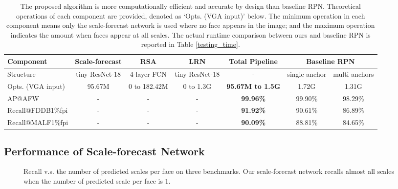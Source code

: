 \documentclass[10pt,twocolumn,letterpaper]{article}
\begin{document}
\begin{table*}
	\caption{The proposed algorithm is more computationally efficient and accurate by design than baseline RPN.
		Theoretical operations of each component are provided, denoted as `Opts. (VGA input)' below.
The minimum operation in each component means only the scale-forecast network is used where no face appears in the image; and the maximum operation indicates the amount when faces appear at all scales.
The actual runtime comparison between ours and baseline RPN is reported in Table \ref{testing_time}.
}
	\vspace{-.2cm}
	\footnotesize{
		\begin{center}
			\begin{tabular}{ l|c  c c c | c c}
				\toprule
				Component  & Scale-forecast & RSA & LRN  & Total Pipeline & \multicolumn{2}{c}{Baseline RPN}\\
				\midrule
				Structure & tiny ResNet-18 & 4-layer FCN & tiny ResNet-18 & - & single anchor & multi anchors \\
Opts. (VGA input) & 95.67M & 0 to 182.42M & 0 to 1.3G & \textbf{95.67M to 1.5G} & 1.72G & 1.31G\\
				\midrule
				AP@AFW	& - & - & - & \textbf{99.96\%} & 99.90\% & 98.29\% \\
				Recall@FDDB1\%fpi & - & - & - & \textbf{91.92\%} & 90.61\% & 86.89\% \\
				Recall@MALF1\%fpi & - & - & - & \textbf{90.09\%} & 88.81\% & 84.65\% \\
				\bottomrule
			\end{tabular}
		\end{center}
	}
	\label{network_details}
	\vspace{-.5cm}
\end{table*}

\subsection{Performance of Scale-forecast Network}\label{sec:performance-of-scale-forecast-network}
\vspace{-.2cm}
\begin{figure}[h]
\centering 
{} 
\caption{Recall v.s. the number of predicted scales per face on three benchmarks. 
	Our scale-forecast network recalls almost all scales when the number of predicted scale per face is 1.} 
\label{scale-forcast_result} 
\end{figure}
\end{document}
